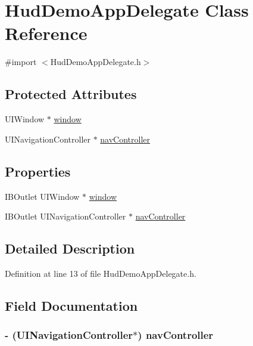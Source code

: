 \hypertarget{interface_hud_demo_app_delegate}{
\section{HudDemoAppDelegate Class Reference}
\label{interface_hud_demo_app_delegate}
}


{\ttfamily \#import $<$HudDemoAppDelegate.h$>$}

\subsection*{Protected Attributes}
\begin{DoxyCompactItemize}
\item 
UIWindow $\ast$ \hyperlink{interface_hud_demo_app_delegate_ae04748cdefebda525b266731b6c120a2}{window}
\item 
UINavigationController $\ast$ \hyperlink{interface_hud_demo_app_delegate_adea0fb546865be49033a1ca2abb7d67e}{navController}
\end{DoxyCompactItemize}
\subsection*{Properties}
\begin{DoxyCompactItemize}
\item 
IBOutlet UIWindow $\ast$ \hyperlink{interface_hud_demo_app_delegate_a055d472434a4ee0b915c207957a400e1}{window}
\item 
IBOutlet UINavigationController $\ast$ \hyperlink{interface_hud_demo_app_delegate_a155d6597b8f13f7e9196524c36c73803}{navController}
\end{DoxyCompactItemize}


\subsection{Detailed Description}


Definition at line 13 of file HudDemoAppDelegate.h.



\subsection{Field Documentation}
\hypertarget{interface_hud_demo_app_delegate_adea0fb546865be49033a1ca2abb7d67e}{
\subsubsection[{navController}]{\setlength{\rightskip}{0pt plus 5cm}-\/ (UINavigationController$\ast$) {\bf navController}}}
\label{interface_hud_demo_app_delegate_adea0fb546865be49033a1ca2abb7d67e}


